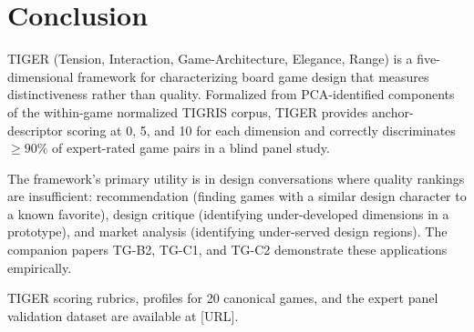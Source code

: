 \section{Conclusion}
\label{sec:conclusion}

TIGER (Tension, Interaction, Game-Architecture, Elegance, Range) is a five-dimensional
framework for characterizing board game design that measures distinctiveness rather than
quality. Formalized from PCA-identified components of the within-game normalized TIGRIS
corpus, TIGER provides anchor-descriptor scoring at 0, 5, and 10 for each dimension and
correctly discriminates $\geq 90\%$ of expert-rated game pairs in a blind panel study.

The framework's primary utility is in design conversations where quality rankings are
insufficient: recommendation (finding games with a similar design character to a known
favorite), design critique (identifying under-developed dimensions in a prototype), and
market analysis (identifying under-served design regions). The companion papers TG-B2,
TG-C1, and TG-C2 demonstrate these applications empirically.

TIGER scoring rubrics, profiles for 20 canonical games, and the expert panel validation
dataset are available at [URL].
